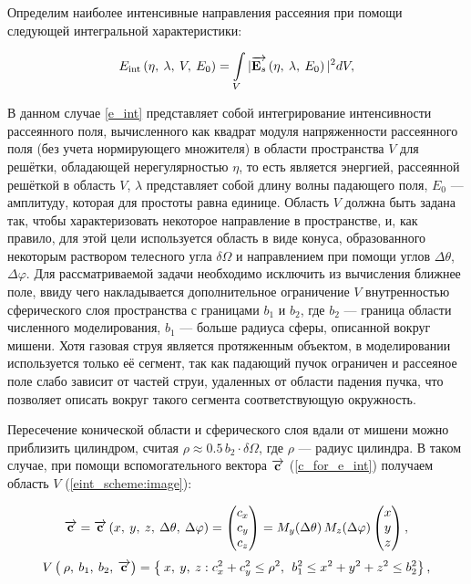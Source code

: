 Определим наиболее интенсивные направления рассеяния при помощи следующей интегральной характеристики: %

    \begin{equation}
        E_{\textrm{int}} \left( \eta,\:\lambda, \:V, \:E_0 \right) = \int\limits_{V}  |\overrightarrow{\textbf{E}_{s}}\left(\eta,\:\lambda, \:E_0\right)|^2 dV,
        \label{e_int}
    \end{equation}

В данном случае \autoref{e_int} представляет собой интегрирование интенсивности рассеянного поля, вычисленного как квадрат модуля напряженности рассеянного поля (без учета нормирующего множителя) в области пространства $V$ для решётки, обладающей нерегулярностью $\eta$, то есть является энергией, рассеянной решёткой в область $V$, $\lambda$ представляет собой длину волны падающего поля, $E_0$ --- амплитуду, которая для простоты равна единице. Область $V$ должна быть задана так, чтобы характеризовать некоторое направление в пространстве, и, как правило, для этой цели используется область в виде конуса, образованного некоторым раствором телесного угла $\delta \Omega$ и направлением при помощи углов $\Delta \theta$, $\Delta \varphi$. Для рассматриваемой задачи необходимо исключить из вычисления ближнее поле, ввиду чего накладывается дополнительное ограничение $V$ внутренностью сферического слоя пространства с границами $b_1$ и $b_2$, где $b_2$ --- граница области численного моделирования, $b_1$ --- больше радиуса сферы, описанной вокруг мишени. Хотя газовая струя является протяженным объектом, в моделировании используется только её сегмент, так как падающий пучок ограничен и рассеяное поле слабо зависит от частей струи, удаленных от области падения пучка, что позволяет описать вокруг такого сегмента соответствующую окружность.

Пересечение конической области и сферического слоя вдали от мишени можно приблизить цилиндром, считая $\rho \approx 0.5\,b_2\cdot\delta \Omega$, где $\rho$ --- радиус цилиндра. В таком случае, при помощи вспомогательного вектора $\overrightarrow{\textbf{c}_{}}$ (\autoref{c_for_e_int}) получаем область $V$ (\autoref{eint_scheme:image}):

    \begin{align}
        \overrightarrow{\textbf{c}_{}} = \overrightarrow{\textbf{c}_{}}\left(x,\:y,\:z,\:\Delta \theta,\:\Delta \varphi \right) = \begin{pmatrix}c_{x}\\c_{y}\\c_{z}\end{pmatrix} = M_y(\Delta \theta)\,M_z(\Delta \varphi)\begin{pmatrix}x\\y\\z\end{pmatrix},
        \label{c_for_e_int}
    \end{align}
    \begin{align}
        V\left(\:\rho, \:b_1, \:b_2, \:\overrightarrow{\textbf{c}_{}} \right) = \left\{\:x,\:y,\:z : c_{x}^2 + c_{y}^2 \leq \rho^2, \:\: b_1^2 \leq x^2 + y^2 + z^2 \leq b_2^2 \right\},
        \label{V_for_e_int}
    \end{align}

